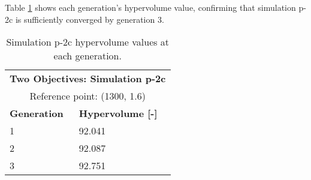 Table \ref{tab:p2c-hypervolume} shows each generation's hypervolume value, 
confirming that simulation p-2c is sufficiently converged by generation 3. 
\begin{table}[htbp!]
    \centering
    \onehalfspacing
    \caption{Simulation p-2c hypervolume values at each generation.}
	\label{tab:p2c-hypervolume}
    \footnotesize
    \begin{tabular}{ll}
    \hline 
    \multicolumn{2}{c}{\textbf{Two Objectives: Simulation p-2c}} \\
    \multicolumn{2}{c}{Reference point: (1300, 1.6)} \\
    \hline 
    \textbf{Generation} & \textbf{Hypervolume [-]} \\
    \hline
    1 & 92.041 \\
    2 & 92.087\\
    3 & 92.751 \\
    \hline
    \end{tabular}
\end{table}

